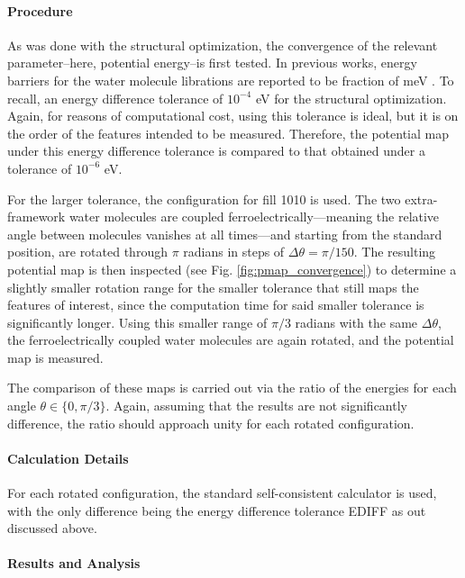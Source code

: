         \paragraph{Procedure} As was done with the structural optimization, the convergence of the relevant parameter--here, potential energy--is first tested. In previous works, energy barriers for the water molecule librations are reported to be fraction of meV \cite{vibr_states}. To recall, an energy difference tolerance of $10^{-4}$ eV for the structural optimization. Again, for reasons of computational cost, using this tolerance is ideal, but it is on the order of the features intended to be measured. Therefore, the potential map under this energy difference tolerance is compared to that obtained under a tolerance of $10^{-6}$ eV. 
        
        For the larger tolerance, the configuration for fill 1010 is used. The two extra-framework water molecules are coupled ferroelectrically---meaning the relative angle between molecules vanishes at all times---and starting from the standard position, are rotated through $\pi$ radians in steps of $\Delta \theta = \pi/150$. The resulting potential map is then inspected (see Fig. \ref{fig:pmap_convergence}) to determine a slightly smaller rotation range for the smaller tolerance that still maps the features of interest, since the computation time for said smaller tolerance is significantly longer. Using this smaller range of $\pi/3$ radians with the same $\Delta \theta$, the ferroelectrically coupled water molecules are again rotated, and the potential map is measured.
        
        The comparison of these maps is carried out via the ratio of the energies for each angle $\theta \in \{0,\pi/3\}$. Again, assuming that the results are not significantly difference, the ratio should approach unity for each rotated configuration.
        
        \paragraph{Calculation Details} For each rotated configuration, the standard self-consistent calculator is used, with the only difference being the energy difference tolerance EDIFF as out discussed above.
        
        \paragraph{Results and Analysis}
        
